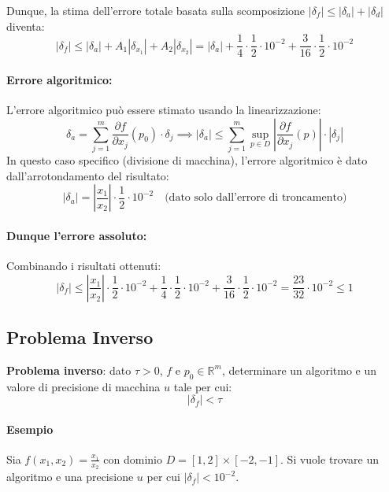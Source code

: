\documentclass[a4paper,12pt]{article}
\begin{document}
	Dunque, la stima dell'errore totale basata sulla scomposizione $|\delta_f| \leqslant |\delta_a| + |\delta_d|$ diventa:
	\[ 
	|\delta_f| \leqslant |\delta_a| + A_1 |\delta_{x_1}| + A_2 |\delta_{x_2}| = |\delta_a| + \frac{1}{4} \cdot \frac{1}{2} \cdot 10^{-2} + \frac{3}{16} \cdot \frac{1}{2} \cdot 10^{-2} 
	\]
	
	\paragraph{Errore algoritmico:}
	L'errore algoritmico può essere stimato usando la linearizzazione:
	\[ 
	\delta_a = \sum_{j=1}^{m} \frac{\partial f}{\partial x_j}(p_0) \cdot \delta_j \implies |\delta_a| \leqslant \sum_{j=1}^{m} \sup_{p \in D} \left| \frac{\partial f}{\partial x_j}(p) \right| \cdot |\delta_j| 
	\]
	In questo caso specifico (divisione di macchina), l'errore algoritmico è dato dall'arrotondamento del risultato:
	\[ 
	|\delta_a| = \left| \frac{x_1}{x_2} \right| \cdot \frac{1}{2} \cdot 10^{-2} \quad \text{(dato solo dall'errore di troncamento)} 
	\]
	
	\paragraph{Dunque l'errore assoluto:}
	Combinando i risultati ottenuti:
	\[ 
	|\delta_f| \leqslant \left| \frac{x_1}{x_2} \right| \cdot \frac{1}{2} \cdot 10^{-2} + \frac{1}{4} \cdot \frac{1}{2} \cdot 10^{-2} + \frac{3}{16} \cdot \frac{1}{2} \cdot 10^{-2} = \frac{23}{32} \cdot 10^{-2} \leqslant 1
	\]
	
	 \subsection*{Problema Inverso}
	 
	 \begin{tcolorbox}[colback=white, colframe=black]
	 	\textbf{Problema inverso}: dato $\tau > 0$, $f$ e $p_0 \in \mathbb{R}^m$, determinare un algoritmo e un valore di precisione di macchina $u$ tale per cui:
	 	\[ |\delta_f| < \tau \]
	 \end{tcolorbox}
	 
	 \paragraph{Esempio}
	 Sia $f(x_1, x_2) = \frac{x_1}{x_2}$ con dominio $D = [1, 2] \times [-2, -1]$. 
	 Si vuole trovare un algoritmo e una precisione $u$ per cui $|\delta_f| < 10^{-2}$.
	 
\end{document}
